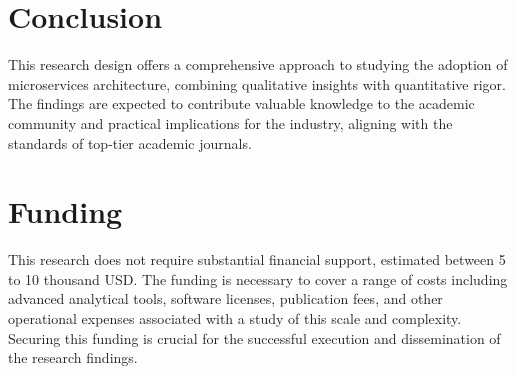 \documentclass{article}
\begin{document}
\section{Conclusion}
\label{sec:conclusion}

This research design offers a comprehensive approach to studying the adoption of microservices architecture, combining qualitative insights with quantitative rigor. The findings are expected to contribute valuable knowledge to the academic community and practical implications for the industry, aligning with the standards of top-tier academic journals.

\section{Funding}
\label{sec:funding}

This research does not require substantial financial support, estimated between 5 to 10 thousand USD. The funding is necessary to cover a range of costs including advanced analytical tools, software licenses, publication fees, and other operational expenses associated with a study of this scale and complexity. Securing this funding is crucial for the successful execution and dissemination of the research findings.
\end{document}
